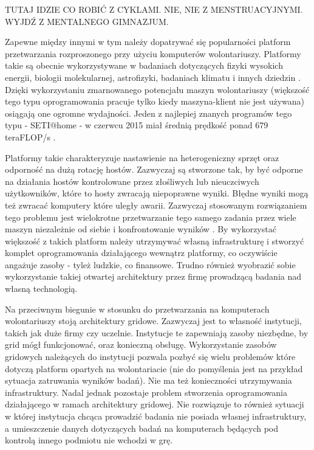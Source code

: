 \documentclass[12pt,a4paper,twoside]{article}
\begin{document}
\Huge{TUTAJ IDZIE CO ROBIĆ Z CYKLAMI. NIE, NIE Z MENSTRUACYJNYMI. WYJDŹ Z MENTALNEGO GIMNAZJUM.}

\normalsize 



Zapewne między innymi w tym należy dopatrywać się popularności platform przetwarzania rozproszonego przy użyciu komputerów wolontariuszy. Platformy takie są obecnie wykorzystywane w badaniach dotyczących fizyki wysokich energii, biologii molekularnej, astrofizyki, badaniach klimatu i innych dziedzin \cite{computational}. Dzięki wykorzystaniu zmarnowanego potencjału maszyn wolontariuszy (większość tego typu oprogramowania pracuje tylko kiedy maszyna-klient nie jest używana) osiągają one ogromne wydajności. Jeden z najlepiej znanych programów tego typu - SETI@home - w czerwcu 2015 miał średnią prędkość ponad 679 teraFLOP/s \cite{boincstats}.

Platformy takie charakteryzuje nastawienie na heterogeniczny sprzęt oraz odporność na dużą rotację hostów. Zazwyczaj są stworzone tak, by być odporne na działania hostów kontrolowane przez złośliwych lub nieuczciwych użytkowników, które to hosty zwracają niepoprawne wyniki. Błędne wyniki mogą też zwracać komputery które uległy awarii. Zazwyczaj stosowanym rozwiązaniem tego problemu jest wielokrotne przetwarzanie tego samego zadania przez wiele maszyn niezależnie od siebie i konfrontowanie wyników \cite{boinc,computational}. By wykorzystać większość z takich platform należy utrzymywać własną infrastrukturę i stworzyć komplet oprogramowania działającego wewnątrz platformy, co oczywiście angażuje zasoby - tyleż ludzkie, co finansowe. Trudno również wyobrazić sobie wykorzystanie takiej otwartej architektury przez firmę prowadzącą badania nad własną technologią.

Na przeciwnym biegunie w stosunku do przetwarzania na komputerach wolontariuszy stoją architektury gridowe. %
Zazwyczaj jest to własność instytucji, takich jak duże firmy czy uczelnie. Instytucje te zapewniają zasoby niezbędne, by grid mógł funkcjonować, oraz konieczną obsługę. Wykorzystanie zasobów gridowych należących do instytucji pozwala pozbyć się wielu problemów które dotyczą platform opartych na wolontariacie (nie do pomyślenia jest na przykład sytuacja zatruwania wyników badań). Nie ma też konieczności utrzymywania infrastruktury. Nadal jednak pozostaje problem stworzenia oprogramowania działającego w ramach architektury gridowej. Nie rozwiązuje to również sytuacji w której instytucja chcąca prowadzić badania nie posiada własnej infrastruktury, a umieszczenie danych dotyczących badań na komputerach będących pod kontrolą innego podmiotu nie wchodzi w grę.
\end{document}
